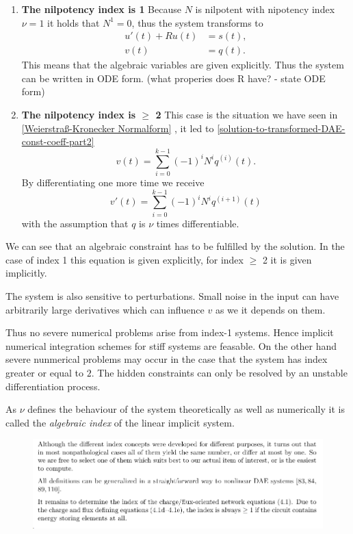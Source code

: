 \begin{enumerate}
	\item \textbf{The nilpotency index is 1} \newline
		Because $N$ is nilpotent with nipotency index $\nu = 1$ it holds that $N^1 = 0$, thus the system transforms to
		\begin{align*}
			u'(t) + Ru(t) &= s(t), \\
			v(t) &= q(t).
		\end{align*}
		This means that the algebraic variables are given explicitly. Thus the system can be written in ODE form. (what properies does R have? - state ODE form)

	\item \textbf{The nilpotency index is $\geq$ 2} \newline
		This case is the situation we have seen in \ref{Weierstraß-Kronecker Normalform} , it led to \ref{solution-to-transformed-DAE-const-coeff-part2}
		\begin{displaymath}
			v(t) = \sum_{i=0}^{k-1} (-1)^iN^iq^{(i)}(t).
		\end{displaymath}
		By differentiating one more time we receive
		\begin{equation}
			v'(t) = \sum_{i=0}^{k-1} (-1)^iN^iq^{(i+1)}(t)
		\end{equation}
		with the assumption that $q$ is $\nu$ times differentiable.
\end{enumerate}

We can see that an algebraic constraint has to be fulfilled by the solution. In the case of index 1 this equation is given explicitly, for index $\geq$ 2 it is given implicitly.

The system is also sensitive to perturbations. Small noise in the input can have arbitrarily large derivatives which can influence $v$ as we it depends on them.

Thus no severe numerical problems arise from index-1 systems. Hence implicit numerical integration schemes for stiff systems are feasable. On the other hand severe nunmerical problems may occur in the case that the system has index greater or equal to $2$. The hidden constraints can only be resolved by an unstable differentiation process.

As $\nu$ defines the behaviour of the system theoretically as well as numerically it is called the \emph{algebraic index} of the linear implicit system.



\begin{figure}[H]
	\centering
	\includegraphics[width=0.7\linewidth]{screenshot022}
	\caption{}
	\label{fig:screenshot022}
\end{figure}


